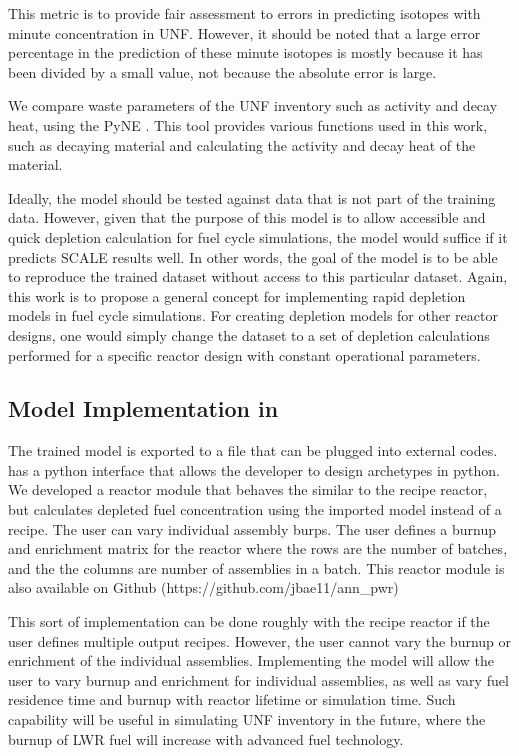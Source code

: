 This metric is to provide fair assessment to errors
in predicting isotopes with minute concentration in \gls{UNF}.
However, it should be noted that a large error percentage in the
prediction of these minute isotopes is mostly because it has been
divided by a small value, not because the absolute error is large.

We compare waste parameters of the \gls{UNF} inventory
such as activity and decay heat, using the
\gls{PyNE} \cite{scopatz_pyne:_2012}. This tool provides
various functions used
in this work, such as decaying material and calculating
the activity and decay heat of the material.

Ideally, the model should be tested against data
that is not part of the training data. However, given
that the purpose of this model is to allow accessible and
quick depletion calculation for
fuel cycle simulations, the model would suffice if
it predicts SCALE results well. In other words, the
goal of the model is to be able to reproduce the
trained dataset without access to this particular dataset.
Again, this work
is to propose a general concept for implementing
rapid depletion models in fuel cycle simulations.
For creating depletion models for other reactor designs,
one would simply change the dataset to a set of depletion
calculations performed for a specific reactor design with
constant operational parameters.


\subsection{Model Implementation in \Cyclus}

The trained model is exported to a file
that can be plugged into external codes. \Cyclus
has a python interface that allows the developer
to design archetypes in python. We developed a reactor
module that behaves the similar to the recipe reactor,
but calculates depleted fuel concentration using the
imported model instead of a recipe. The user can vary
individual assembly burps. The user defines a burnup
and enrichment
matrix for the reactor where the rows are the number
of batches, and the the columns are number of
assemblies in a batch. This reactor module is also
available on Github 
(https://github.com/jbae11/ann\_pwr)

This sort of implementation can be done roughly with
the recipe reactor if the user defines multiple
output recipes. However, the user cannot vary the
burnup or enrichment of the individual assemblies.
Implementing the model will allow the user to vary
burnup and enrichment for individual assemblies, as well
as vary fuel residence time and burnup with reactor
lifetime or simulation time. Such capability will be
useful in simulating \gls{UNF} inventory in the future,
where the burnup of \gls{LWR} fuel will increase
with advanced fuel technology.
